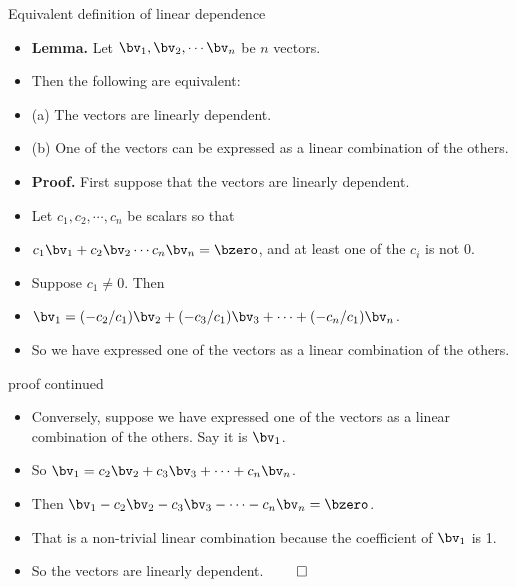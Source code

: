 \documentclass{beamer}
\begin{document}
\begin{frame}{Equivalent definition of linear dependence}

\begin{itemize}
\item \textbf{Lemma.} Let $\bv_1,\bv_2,\cdots\bv_n$ be $n$ vectors.
\item Then the following are equivalent:
\item (a) The vectors are linearly dependent.
\item (b) One of the vectors can be expressed as a linear combination of the others.
\item \textbf{Proof.} First suppose that the vectors are linearly dependent.
\item Let $c_1,c_2,\cdots,c_n$ be scalars so that
\item $c_1\bv_1+c_2\bv_2\cdots c_n\bv_n = \bzero$, and at least one of the $c_i$ is not 0.
\item Suppose $c_1\not=0$. Then
\item $\bv_1 = (-c_2/c_1)\bv_2 + (-c_3/c_1)\bv_3 + \cdots + (-c_n/c_1)\bv_n$.
\item So we have expressed one of the vectors as a linear combination of the others.
\end{itemize}

\end{frame}


\begin{frame}{proof continued}

\begin{itemize}
\item Conversely, suppose we have expressed one of the vectors as a linear combination
of the others. Say it is $\bv_1$.
\item So $\bv_1 = c_2\bv_2 + c_3\bv_3 + \cdots + c_n \bv_n$.
\item Then $\bv_1 - c_2\bv_2 - c_3\bv_3 - \cdots - c_n\bv_n = \bzero$.
\item That is a non-trivial linear combination because the coefficient of $\bv_1$ is 1.
\item So the vectors are linearly dependent. $\qed$

\end{itemize}

\end{frame}

\end{document}
